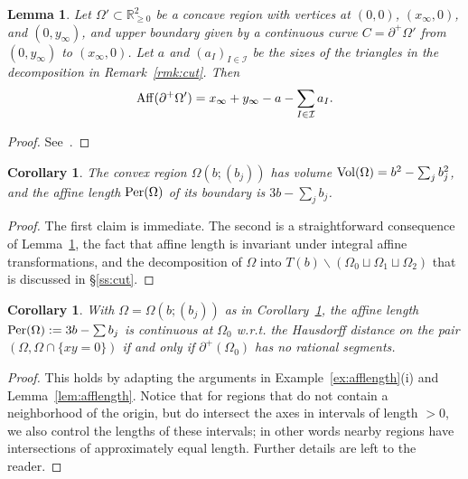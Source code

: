 \documentclass[11pt, reqno]{amsart}
\newtheorem{lemma}[thm]{Lemma}
\newtheorem{cor}[thm]{Corollary}
\theoremstyle{remark}
\numberwithin{equation}{subsection}
\numberwithin{figure}{section}
\theoremstyle{customremark}
\newcommand{\Ii}{\mathcal{I}}
\newcommand{\Vol}{{\rm Vol}}
\newcommand{\Per}{{\rm Per}}
\newcommand{\Aff}{{\rm Aff}}
\newcommand{\Om}{{\Omega}}
\newcommand{\less} {{\smallsetminus}}
\newcommand{\p}{{\partial}}
\newcommand{\R}{\mathbb{R}}
\begin{document}
\begin{lemma}\label{lem:aff} Let $\Om'\subset \R^2_{\ge 0}$ be a concave region with vertices at $(0,0)$,  $(x_\infty,0)$,  and $(0,y_\infty)$, and upper boundary given by a 
continuous curve $C = \p^+ \Om'$ from 
$(0,y_\infty)$ to $(x_\infty,0)$.   Let $a$ and $ (a_I)_{I\in \Ii} $ be the sizes of the triangles in the decomposition
in Remark~\ref{rmk:cut}. Then 
\begin{align}\label{eq:aff}
\Aff(\p^+\Om') = x_\infty +y_\infty - a - \sum_{I\in \Ii} a_I.
\end{align}
\end{lemma}

\begin{proof} See~\cite[Lem.3.6]{Ruel}.
\end{proof}


\begin{cor}\label{cor:aff1}  The convex region $\Om(b; (b_j))$ has volume $\Vol(\Om) = b^2 - \sum_j b_j^2$, and the affine length $\Per(\Om)$ of its boundary  is $3b - \sum_j b_j$.
\end{cor}
\begin{proof} The first claim is immediate.  
The second is a straightforward consequence of Lemma~\ref{lem:aff}, the fact that affine length is invariant  under integral affine  transformations, and the decomposition  of $\Om$ into $T(b) \less (\Om_0\sqcup\Om_1\sqcup\Om_2)$ that is discussed in \S\ref{ss:cut}.
\end{proof}


\begin{cor}\label{cor:aff2}   With $\Om=\Om(b; (b_j))$ as in Corollary~\ref{cor:aff1}, the affine length $\Per(\Om): = 3b-\sum b_j$ is continuous  at $\Om_0$ w.r.t. the Hausdorff distance on the pair $(\Om, \Om\cap \{xy=0\})$ 
 if and only if $\p^+(\Om_0)$ has no rational segments.  
 \end{cor}
 \begin{proof} This holds by adapting the arguments  in Example~\ref{ex:afflength}(i) and Lemma~\ref{lem:afflength}.  Notice that for regions that do not contain a neighborhood of the origin, but do intersect the axes in intervals of length $>0$, we also control the lengths of these intervals; in other words nearby regions have intersections of approximately equal length.   Further details are left to the reader.
 \end{proof}
 
\end{document}
